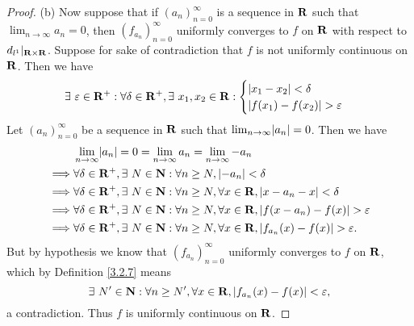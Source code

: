 \begin{proof}{(b)}
    Now suppose that if \((a_n)_{n = 0}^\infty\) is a sequence in \(\mathbf{R}\) such that \(\lim_{n \to \infty} a_n = 0\), then \((f_{a_n})_{n = 0}^\infty\) uniformly converges to \(f\) on \(\mathbf{R}\) with respect to \(d_{l^1}|_{\mathbf{R} \times \mathbf{R}}\).
    Suppose for sake of contradiction that \(f\) is not uniformly continuous on \(\mathbf{R}\).
    Then we have
    \[
        \exists\ \varepsilon \in \mathbf{R}^+ : \forall \delta \in \mathbf{R}^+, \exists\ x_1, x_2 \in \mathbf{R} : \begin{cases}
            \left\lvert x_1 - x_2\right\rvert < \delta \\
            \left\lvert f(x_1) - f(x_2)\right\rvert > \varepsilon
        \end{cases}
    \]
    Let \((a_n)_{n = 0}^\infty\) be a sequence in \(\mathbf{R}\) such that \(\lim_{n \to \infty} \abs{a_n} = 0\).
    Then we have
    \begin{align*}
                 & \lim_{n \to \infty} \abs{a_n} = 0 = \lim_{n \to \infty} a_n = \lim_{n \to \infty} -a_n                                  \\
        \implies & \forall \delta \in \R^+, \exists\ N \in \N : \forall n \geq N, \abs{-a_n} < \delta                                      \\
        \implies & \forall \delta \in \R^+, \exists\ N \in \N : \forall n \geq N, \forall x \in \R, \abs{x - a_n - x} < \delta             \\
        \implies & \forall \delta \in \R^+, \exists\ N \in \N : \forall n \geq N, \forall x \in \R, \abs{f(x - a_n) - f(x)} > \varepsilon  \\
        \implies & \forall \delta \in \R^+, \exists\ N \in \N : \forall n \geq N, \forall x \in \R, \abs{f_{a_n}(x) - f(x)} > \varepsilon.
    \end{align*}
    But by hypothesis we know that \((f_{a_n})_{n = 0}^\infty\) uniformly converges to \(f\) on \(\mathbf{R}\), which by Definition \ref{3.2.7} means
    \[
        \exists\ N' \in \mathbf{N} : \forall n \geq N', \forall x \in \mathbf{R}, \left\lvert f_{a_n}(x) - f(x)\right\rvert < \varepsilon,
    \]
    a contradiction.
    Thus \(f\) is uniformly continuous on \(\mathbf{R}\).
\end{proof}

